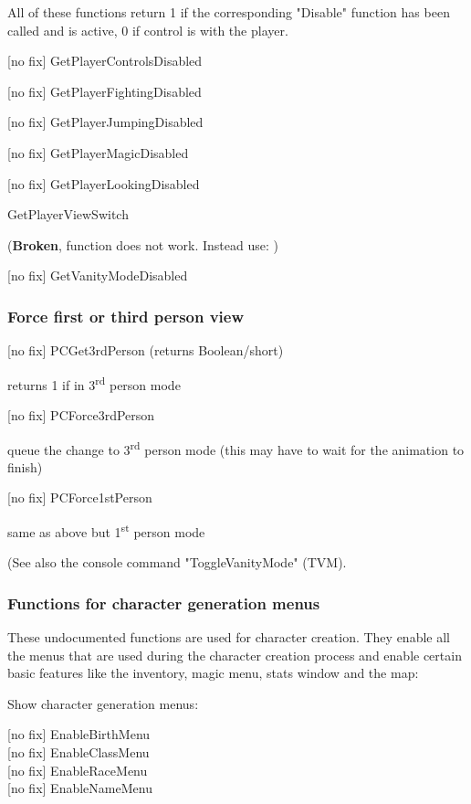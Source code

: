 \documentclass[
]{article}
\begin{document}
All of these functions return 1 if the corresponding "Disable" function
has been called and is active, 0 if control is with the player.

{[}no fix{]} GetPlayerControlsDisabled

{[}no fix{]} GetPlayerFightingDisabled

{[}no fix{]} GetPlayerJumpingDisabled

{[}no fix{]} GetPlayerMagicDisabled

{[}no fix{]} GetPlayerLookingDisabled

GetPlayerViewSwitch

(\textbf{Broken}, function does not work. Instead use: )

{[}no fix{]} GetVanityModeDisabled

\hypertarget{force-first-or-third-person-view}{%
\subsubsection{Force first or third person
view}\label{force-first-or-third-person-view}}

{[}no fix{]} PCGet3rdPerson (returns Boolean/short)

returns 1 if in 3\textsuperscript{rd} person mode

{[}no fix{]} PCForce3rdPerson

queue the change to 3\textsuperscript{rd} person mode (this may have to
wait for the animation to finish)

{[}no fix{]} PCForce1stPerson

same as above but 1\textsuperscript{st} person mode

(See also the console command "ToggleVanityMode" (TVM).

\hypertarget{functions-for-character-generation-menus}{%
\subsubsection{Functions for character generation
menus}\label{functions-for-character-generation-menus}}

These undocumented functions are used for character creation. They
enable all the menus that are used during the character creation process
and enable certain basic features like the inventory, magic menu, stats
window and the map:

Show character generation menus:

{[}no fix{]} EnableBirthMenu\\
{[}no fix{]} EnableClassMenu\\
{[}no fix{]} EnableRaceMenu\\
{[}no fix{]} EnableNameMenu
\end{document}
